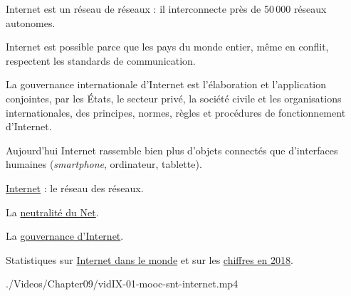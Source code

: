 \begin{jazzitemize}
\item Internet est un réseau de réseaux : il interconnecte près de 50\,000 réseaux autonomes.
\item Internet est possible parce que les pays du monde entier, même en conflit, respectent les standards de communication. 
\item La gouvernance internationale d'Internet est l’élaboration et l’application conjointes, par les États, le secteur privé, la société civile et les organisations internationales, des principes, normes, règles et procédures de fonctionnement d'Internet.
\item Aujourd'hui Internet rassemble bien plus d'objets connectés que d'interfaces humaines (\textit{smartphone}, ordinateur, tablette).
\end{jazzitemize}


\begin{jazzitemize}
\item \href{https://fr.wikipedia.org/wiki/Internet}{Internet} : le réseau des réseaux.
\item La \href{https://fr.wikipedia.org/wiki/Neutralit\%C3\%A9_du_r\%C3\%A9seau}{neutralité du Net}.
\item La \href{https://fr.wikipedia.org/wiki/Gouvernance_d\%27Internet}{gouvernance d'Internet}.
\item Statistiques sur \href{https://fr.wikipedia.org/wiki/Internet_dans_le_monde}{Internet dans le monde} et sur les \href{https://www.blogdumoderateur.com/chiffres-internet/}{chiffres en 2018}.
\end{jazzitemize}

\begin{marginvideo}
		{./Videos/Chapter09/vidIX-01-mooc-snt-internet.mp4}%
\end{marginvideo}

